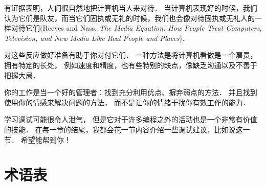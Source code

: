 有证据表明，人们很自然地把计算机当人来对待．
当计算机表现好的时候，我们认为它们是队友，而当它们固执或无礼的时候，我们也会像对待固执或无礼人的一样对待它们(Reeves and Nass, {\it The Media Equation: How People Treat Computers, Television, and New Media Like Real People and Places})．
  
  


对这些反应做好准备有助于你对付它们．  一种方法是将计算机看做是一个雇员，拥有特定的长处， 例如速度和精度，也有些特别的缺点，像缺乏沟通以及不善于把握大局．


你的工作是当一个好的管理者：找到充分利用优点、摒弃弱点的方法．  并且找到使用你的情感来解决问题的方法， 而不是让你的情绪干扰你有效工作的能力．


学习调试可能很令人泄气， 但是它对于许多编程之外的活动也是一个非常有价值的技能．  在每一章的结尾，我都会花一节内容介绍一些调试建议，比如说这一节． 希望能帮到你！

\section{术语表}

